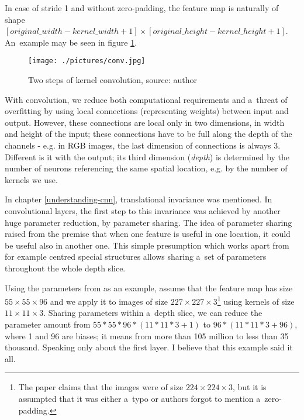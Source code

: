 In case of stride 1 and without zero-padding, the feature map is naturally of 
shape $[original\_width - kernel\_width + 1] \times [original\_height - 
kernel\_height + 1]$. An~example may be seen in figure \ref{fig:conv}. 

\begin{figure}[h]
   \centering
	\texttt{[image: ./pictures/conv.jpg]}
	\caption[Kernel convolution]{Two steps of kernel convolution, source: author}
      \label{fig:conv}
\end{figure}

With convolution, we reduce both computational requirements and a~threat of 
overfitting by using local connections (representing weights) between input and
output. However, these connections are local only in two dimensions, in width 
and height of the input; these connections have to be full along the depth of
the channels - e.g. in RGB images, the last dimension of connections is always
3. Different is it with the output; its third dimension (\textit{depth}) is 
determined by the number of neurons referencing the same spatial location, e.g.
by the number of kernels we use. 

In chapter \ref{understanding-cnn}, translational invariance was mentioned. In 
convolutional layers, the first step to this invariance was achieved by another
huge parameter reduction, by parameter sharing. The idea of parameter sharing
raised from the premise that when one feature is useful in one location, it
could be
useful also in another one. This simple presumption which works apart from for
example centred special structures allows sharing a~set of parameters 
throughout the whole depth slice. 

Using the parameters from \cite{cnn-classification} as an example, assume that
the feature map has size $55 \times 55 \times 96$ and we apply it to images of
size $227 \times 227 \times 3$\footnote{The paper claims that the images were
of size $224 \times 224 \times 3$, but it is assumpted that it was either
a~typo or authors forgot to mention a~zero-padding.} using kernels of size
$11 \times 11 \times 3$. Sharing parameters within a~depth slice, we can reduce
the parameter amount from $55 * 55 * 96 * (11 * 11 * 3 + 1)$ to
$96 * (11 * 11 * 3 + 96)$, where 1 and 96 are biases; it means from more than
105 million to less than 35 thousand. Speaking only about the first layer. I
believe that this example said it all. 

